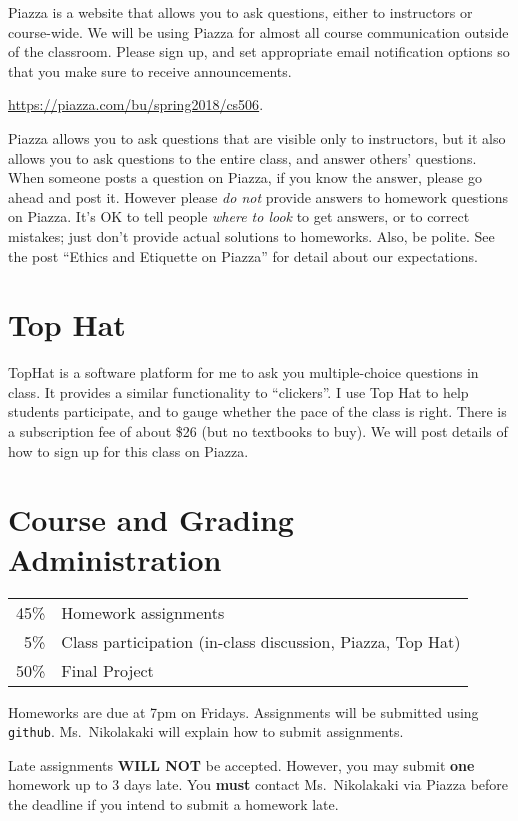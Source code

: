 \documentclass[11pt]{article}
\begin{document}
Piazza is a website that allows you to ask questions, either to
instructors or course-wide.  We will be using Piazza for almost all course
communication outside of the classroom. Please sign up, and set
appropriate email notification options so that you make sure to
receive announcements.

\url{https://piazza.com/bu/spring2018/cs506}. 

Piazza allows you to ask questions that are visible only to
instructors, but it also allows you to ask questions to the entire
class, and answer others' questions. When someone posts a question on
Piazza, if you know the answer, please go ahead and post it.  However
please \emph{do not} provide answers to homework questions on Piazza.
It's OK to tell people \emph{where to look} to get answers, or to
correct mistakes; just don't provide actual solutions to
homeworks. Also, be polite. 
See the post ``Ethics and Etiquette on Piazza'' 
for detail about our expectations.


\section*{Top Hat}

TopHat is a software platform for me to ask you multiple-choice questions in class. It
provides a similar functionality to ``clickers''. I use Top Hat to
help students participate, and to gauge whether the pace of the class
is right. 
%
There is a subscription fee of about \$26 (but no textbooks to buy). 
%
We will post details of how to sign up for this class on Piazza.


\newpage 
\section*{Course and Grading Administration}
\begin{tabular}{rl}
45\% & Homework assignments  \\
5\% & Class participation (in-class discussion, Piazza, Top Hat)\\
50\% & Final Project \\
\end{tabular}

Homeworks are due at 7pm on Fridays.
Assignments will be submitted using \texttt{github}.   Ms.\ Nikolakaki will
explain how to submit assignments.  

Late assignments \textbf{WILL NOT} be accepted. 
However, you may submit \textbf{one} homework up to 3 days late.   You
\textbf{must} contact Ms.\ Nikolakaki via Piazza before the deadline if you intend to
submit a homework late. 
\end{document}
